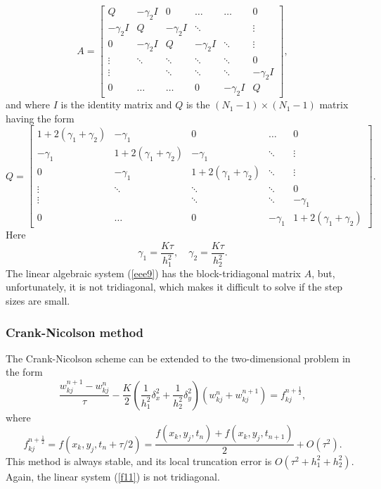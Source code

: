 \begin{equation}
A=\left[
\begin{array}{cccccc}
Q &-\gamma_{2}I &0      &\dots  &\dots &0 \\
-\gamma_{2}I &Q &-\gamma_{2}I &\ddots  &     &\vdots \\
0      &-\gamma_{2}I &Q &-\gamma_{2}I &\ddots &\vdots \\
\vdots &\ddots &\ddots &\ddots &\ddots &0 \\
\vdots &       &\ddots &\ddots &\ddots &-\gamma_{2}I \\
0      &\dots  &\dots  &0      &-\gamma_{2}I &Q
\end{array}\right], \label{eee10}
\end{equation}
and where $I$ is the identity matrix and $Q$ is the $(N_{1}-1)\times(N_{1}-1)$ matrix having the form
\begin{equation}
Q=\left[
\begin{array}{cccccc}
1+2(\gamma_{1}+\gamma_{2}) &-\gamma_{1}  &0      &\dots  &0 \\
-\gamma_{1} &1+2(\gamma_{1}+\gamma_{2})  &-\gamma_{1}     &\ddots       &\vdots \\
0  &-\gamma_{1} &1+2(\gamma_{1}+\gamma_{2})      &\ddots       &\vdots \\
\vdots &\ddots &\ddots &\ddots &0 \\
\vdots &       &\ddots &\ddots &-\gamma_{1} \\
0      &\dots  &0      &-\gamma_{1} &1+2(\gamma_{1}+\gamma_{2})
\end{array}\right]. \label{eee11}
\end{equation}
Here
\[
\gamma_{1}=\frac{K\tau}{h_{1}^2}, \quad \gamma_{2}=\frac{K\tau}{h_{2}^2}.
\]
The linear algebraic system (\ref{eee9}) has
the block-tridiagonal matrix $A$, but, unfortunately, it
is not tridiagonal,
which makes it difficult to solve if the step sizes are small.


\subsubsection{Crank-Nicolson method}
The Crank-Nicolson scheme can be extended to the two-dimensional problem in the form
\begin{equation}
\frac{w_{kj}^{n+1}-w_{kj}^{n}}{\tau} -\frac{K}{2}
\left(\frac{1}{h_{1}^2}
\delta_{x}^2+\frac{1}{h_{2}^2}\delta_{y}^2\right)
\left(w_{kj}^{n}+w_{kj}^{n+1}\right)=f_{kj}^{n+\frac{1}{2}}, \label{f11}
\end{equation}
where
\[
f_{kj}^{n+\frac{1}{2}}=f(x_{k},y_{j},t_{n}+\tau/2)=\frac{f(x_{k},y_{j},t_{n})+f(x_{k},y_{j},t_{n+1})}{2}+O(\tau^2).
\]
This method is always stable, and its local truncation error is
$O(\tau^2+h_{1}^2+h_{2}^2)$. Again, the linear system (\ref{f11})
is not tridiagonal.


